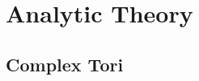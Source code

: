 \documentclass[Total.tex]{subfiles}
\begin{document}
	\chapter{Analytic Theory}
		\section{Complex Tori}
\end{document}
